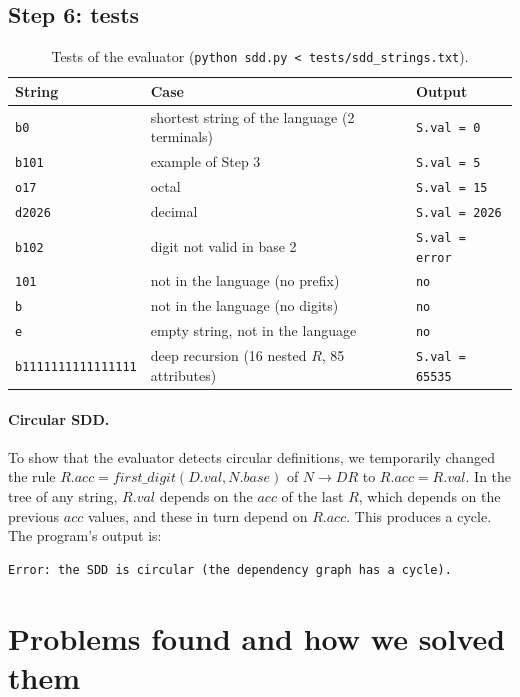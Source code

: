 \documentclass[11pt,a4paper]{article}
\newcommand{\code}[1]{\texttt{#1}}
\begin{document}
\subsection{Step 6: tests}

\begin{table}[H]
\centering
\begin{tabular}{@{}lll@{}}
\toprule
String & Case & Output \\
\midrule
\code{b0}   & shortest string of the language (2 terminals) & \code{S.val = 0} \\
\code{b101} & example of Step 3 & \code{S.val = 5} \\
\code{o17}  & octal & \code{S.val = 15} \\
\code{d2026} & decimal & \code{S.val = 2026} \\
\code{b102} & digit not valid in base 2 & \code{S.val = error} \\
\code{101}  & not in the language (no prefix) & \code{no} \\
\code{b}    & not in the language (no digits) & \code{no} \\
\code{e}    & empty string, not in the language & \code{no} \\
\code{b1111111111111111} & deep recursion (16 nested $R$, 85 attributes) & \code{S.val = 65535} \\
\bottomrule
\end{tabular}
\caption{Tests of the evaluator (\code{python sdd.py < tests/sdd\_strings.txt}).}
\end{table}

\paragraph{Circular SDD.} To show that the evaluator detects circular definitions, we temporarily changed the
rule $R.acc = first\_digit(D.val, N.base)$ of $N \to DR$ to $R.acc = R.val$. In the tree of any string,
$R.val$ depends on the $acc$ of the last $R$, which depends on the previous $acc$ values, and these in turn depend on $R.acc$. This
produces a cycle. The program's output is:
\begin{lstlisting}
Error: the SDD is circular (the dependency graph has a cycle).
\end{lstlisting}

\section{Problems found and how we solved them}
\end{document}

